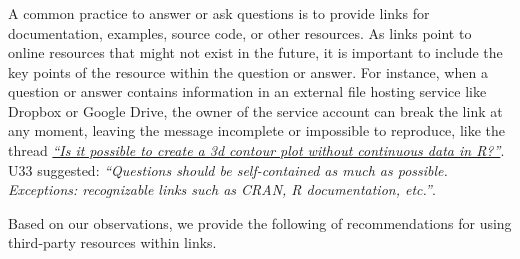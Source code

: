 \subsubsection{\recd}

    A common practice to answer or ask questions is to provide links for documentation, examples, source code, or other resources.
    As links point to online resources that might not exist in the future, it is important to include the key points of the resource within the question or answer.
    For instance, when a question or answer contains information in an external file hosting service like Dropbox or Google Drive, the owner of the service account can break the link at any moment, leaving the message incomplete or impossible to reproduce, like the thread \textit{\href{http://goo.gl/5nanFU}{``Is it possible to create a 3d contour plot without continuous data in R?''}}.
    U33 suggested: \textit{``Questions should be self-contained as much as possible. Exceptions: recognizable links such as CRAN, R documentation, etc.''}.

    Based on our observations, we provide the following of recommendations for using third-party resources within links.

